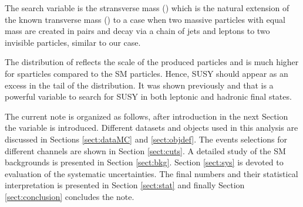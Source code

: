 The search variable is the stransverse mass (\mttwo) which is the natural extension of the known transverse mass (\mt) to a case 
when two massive particles with equal mass are created in pairs and decay via a chain of jets and leptons to two 
invisible particles, similar to our case.

The distribution of \mttwo reflects the scale of the produced particles and is much higher for sparticles
compared to the SM particles. Hence, SUSY should appear as an excess in the tail of the \mttwo distribution.
It was shown previously  \cite{Khachatryan:2014qwa}  and \cite{MT2_2011} that \mttwo is a powerful variable to search for SUSY in both
 leptonic and hadronic final states.

The current note is organized as follows, after introduction in the next Section the \mttwo variable is introduced. Different datasets 
and objects used in this analysis are discussed in Sections \ref{sect:dataMC} and \ref{sect:objdef}. The events selections for different channels
are shown in Section \ref{sect:cuts}. A detailed study of the SM backgrounds is presented in Section \ref{sect:bkg}. Section \ref{sect:sys} 
is devoted to evaluation of the systematic uncertainties. The final numbers and their statistical interpretation is presented in 
Section \ref{sect:stat} %
and finally Section \ref{sect:conclusion} concludes the note.





